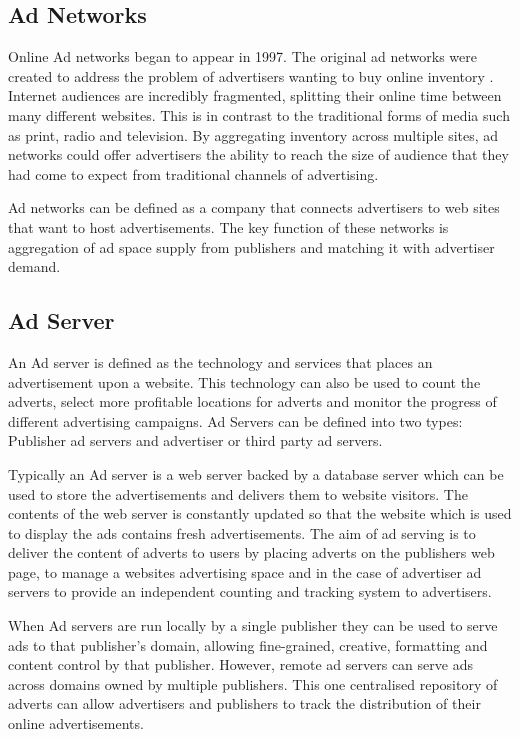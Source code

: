 \documentclass[12pt]{article}
\begin{document}
\subsection{Ad Networks} \label{AdNetwork}
Online Ad networks began to appear in 1997. The original ad networks were created to address the problem of advertisers wanting to buy online inventory \parencite{adExchanges}. Internet audiences are incredibly fragmented, splitting their online time between many different websites. This is in contrast to the traditional forms of media such as print, radio and television. By aggregating inventory across multiple sites, ad networks could offer advertisers the ability to reach the size of audience that they had come to expect from traditional channels of advertising. \newline

Ad networks can be defined as a company that connects advertisers to web sites that want to host advertisements. The key function of these networks is aggregation of ad space supply from publishers and matching it with advertiser demand. 

\subsection{ Ad Server}
An Ad server is defined as the technology and services that places an advertisement upon a website. This technology can also be used to count the adverts, select more profitable locations for adverts and monitor the progress of different advertising campaigns. Ad Servers can be defined into two types: Publisher ad servers and advertiser or third party ad servers. \newline 

Typically an Ad server is a web server backed by a database server which can be used to store the advertisements and delivers them to website visitors. The contents of the web server is constantly updated so that the website which is used to display the ads contains fresh advertisements. The aim of ad serving is to deliver the content of adverts to users by placing adverts on the publishers web page, to manage a websites advertising space and in the case of advertiser ad servers to provide an independent counting and tracking system to advertisers. \newline 

When Ad servers are run locally by a single publisher they can be used to serve ads to that publisher's domain, allowing fine-grained, creative, formatting and content control by that publisher. However, remote ad servers can serve ads across domains owned by multiple publishers. This one centralised repository of adverts can allow advertisers and publishers to track the distribution of their online advertisements. 
\end{document}

